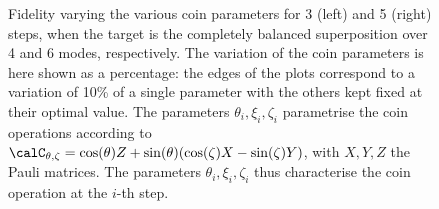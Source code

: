 \begin{figure}[]
    \centering
    \begin{minipage}[b]{0.5\textwidth}
    \end{minipage}%
    \begin{minipage}[b]{0.5\textwidth}
    \end{minipage}
    \caption{
        Fidelity varying the various coin parameters for 3 (left) and 5 (right) steps, when the target is the completely balanced superposition over 4 and 6 modes, respectively.
        The variation of the coin parameters is here shown as a percentage: the edges of the plots correspond to a variation of 10\% of a single parameter with the others kept fixed at their optimal value.
        The parameters $\theta_i,\xi_i,\zeta_i$ parametrise the coin operations according to
        $\calC_{\theta,\zeta} = \cos(\theta) Z + \sin(\theta)(\cos(\zeta) X - \sin(\zeta) Y)$, with $X,Y,Z$ the Pauli matrices.
        The parameters $\theta_i,\xi_i, \zeta_i$ thus characterise the coin operation at the $i$-th step.
    }
    \label{fig:stabilities_3and5steps_balanced_target}
\end{figure}

